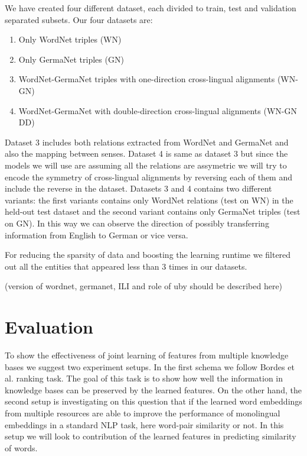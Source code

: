  We have created four different dataset, each divided to train, test and validation separated subsets. Our four datasets are:
 \begin{enumerate}
 \item Only WordNet triples (WN)
 \item Only GermaNet triples (GN)
 \item WordNet-GermaNet triples with one-direction cross-lingual alignments (WN-GN)
 \item WordNet-GermaNet with double-direction cross-lingual alignments (WN-GN DD)
 \end{enumerate}
 
 Dataset 3 includes both relations extracted from WordNet and GermaNet and also the mapping between senses.
 Dataset 4 is same as dataset 3 but since the models we will use are assuming all the relations are assymetric 
 we will try to encode the symmetry of cross-lingual alignments by reversing each of them and include the reverse in the dataset.
 Datasets 3 and 4 contains two different variants: the first variants contains only WordNet relations (test on WN) 
 in the held-out test dataset and the second variant contains only GermaNet triples (test on GN).
  In this way we can observe the direction of
  possibly transferring information from English to German or vice versa.
  
  For reducing the sparsity of data and boosting the learning runtime we 
  filtered out all the entities that appeared less than 3 times in our datasets.
   
  (version of wordnet, germanet, ILI and role of uby should be described here)  
 

\section{Evaluation}
\label{sec:ent-link-eval}

To show the effectiveness of joint learning of features from multiple knowledge bases we suggest 
two experiment setups. In the first schema we follow Bordes et al. ranking task. The goal of this task is
to show how well the information in knowledge bases can be preserved by the learned features. 
 On the other hand, the second
setup is investigating on this question that if the learned word embeddings from multiple resources
are able to improve the performance of monolingual embeddings in a standard NLP
task, here word-pair similarity or not.
In this setup we will look to contribution of the learned features in predicting similarity of words.

